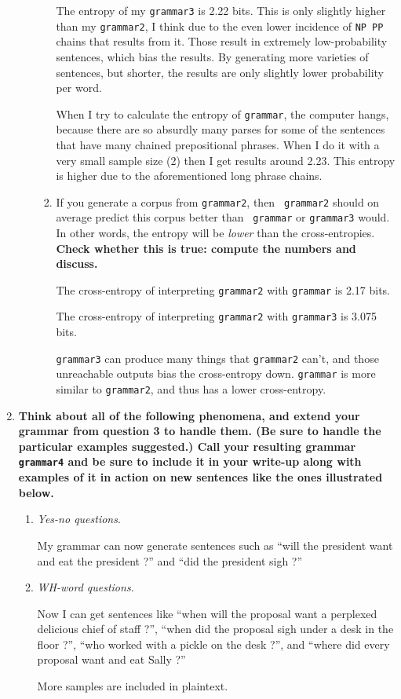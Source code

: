 \documentclass[10pt]{article}
\begin{document}
\begin{enumerate}
\begin{enumerate}
\begin{enumerate}
    The entropy of my {\tt grammar3} is 2.22 bits. This is only slightly higher than my {\tt grammar2}, I think due to the even lower incidence of \verb|NP PP| chains that results from it. Those result in extremely low-probability sentences, which bias the results. By generating more varieties of sentences, but shorter, the results are only slightly lower probability per word.
    
    When I try to calculate the entropy of {\tt grammar}, the computer hangs, because there are so absurdly many parses for some of the sentences that have many chained prepositional phrases. When I do it with a very small sample size (2) then I get results around 2.23. This entropy is higher due to the aforementioned long phrase chains.

\item If you generate a corpus from {\tt grammar2}, then {\tt
    grammar2} should on average predict this corpus better than {\tt
    grammar} or {\tt grammar3} would. In other words, the entropy will
  be {\it lower} than the cross-entropies. {\bf Check whether this is true:
    compute the numbers and discuss.} 
    
    The cross-entropy of interpreting {\tt grammar2} with {\tt grammar} is 2.17 bits.
    
    The cross-entropy of interpreting {\tt grammar2} with {\tt grammar3} is 3.075 bits.
    
    {\tt grammar3} can produce many things that {\tt grammar2} can't, and those unreachable outputs bias the cross-entropy down. {\tt grammar} is more similar to {\tt grammar2}, and thus has a lower cross-entropy.
    
    \end{enumerate}
\end{enumerate}

\item  {\bf Think about all of the following phenomena, and extend your grammar
  from question 3 to handle them. (Be sure to handle the particular
  examples suggested.)  Call your resulting grammar
  \verb|grammar4| and be sure to include it in your write-up along with examples of it
  in action on new sentences like the ones illustrated below.}

\begin{enumerate}
\item {\it Yes-no questions}.

My grammar can now generate sentences such as ``will the president want and eat the president ?'' and ``did the president sigh ?''

\item {\it WH-word questions.} 

Now I can get sentences like ``when will the proposal want a perplexed delicious chief of staff ?'', ``when did the proposal sigh under a desk in the floor ?'', ``who worked with a pickle on the desk ?'', and ``where did every proposal want and eat Sally ?''

More samples are included in plaintext.
\end{enumerate}
\end{enumerate}
\end{document}
